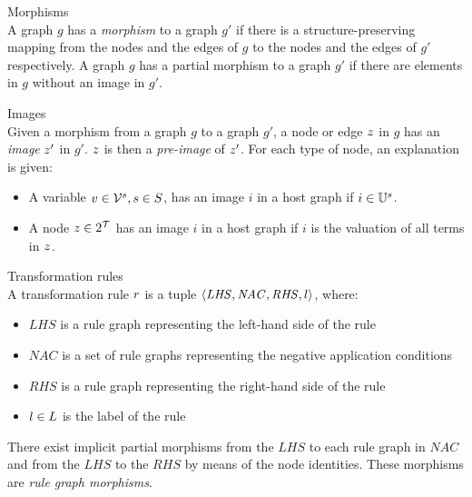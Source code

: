 \vspace{5px}
\begin{definition} Morphisms \\
A graph $g$ has a \textit{morphism} to a graph $g'$ if there is a structure-preserving mapping from the nodes and the edges of $g$ to the nodes and the edges of $g'$ respectively. A graph $g$ has a partial morphism to a graph $g'$ if there are elements in $g$ without an image in $g'$.
\end{definition}
\vspace{5px}

\begin{definition} Images \\
Given a morphism from a graph $g$ to a graph $g'$, a node or edge $z$ in $g$ has an \textit{image} $z'$ in $g'$. $z$ is then a \textit{pre-image} of $z'$. For each type of node, an explanation is given:
\begin{itemize}
  \item A variable $v \in \mathcal{V}^{s}, s \in S$, has an image $i$ in a host graph if $i \in \mathbb{U}^{s}$. 
  \item A node $z \in 2^{\mathcal{T}}$ has an image $i$ in a host graph if $i$ is the valuation of all terms in $z$. 
\end{itemize}
\end{definition}

\vspace{5px}
\begin{definition} Transformation rules \\
A transformation rule $r$ is a tuple $\langle \mathit{LHS}, \mathit{NAC}, \mathit{RHS}, l \rangle$, where:
\begin{itemize}
  \item $\mathit{LHS}$ is a rule graph representing the left-hand side of the rule
  \item $\mathit{NAC}$ is a set of rule graphs representing the negative application conditions
  \item $\mathit{RHS}$ is a rule graph representing the right-hand side of the rule
  \item $l \in L$ is the label of the rule
\end{itemize}
There exist implicit partial morphisms from the $\mathit{LHS}$ to each rule graph in $\mathit{NAC}$ and from the $\mathit{LHS}$ to the $\mathit{RHS}$ by means of the node identities. These morphisms are \textit{rule graph morphisms}.
\end{definition}
\vspace{5px}

